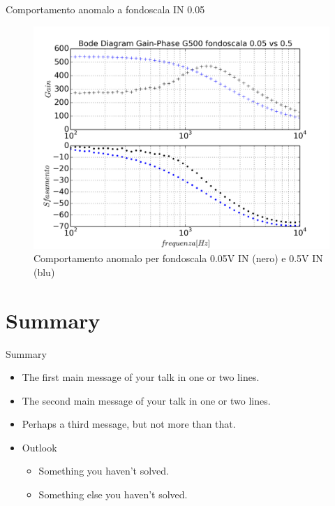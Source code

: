 \documentclass{beamer}
\begin{document}
\begin{frame}{Comportamento anomalo a fondoscala IN 0.05}
\begin{figure}
\centering
\includegraphics[width=0.9\linewidth]{./es_9_bode_g500_strano_bi}
\caption{Comportamento anomalo per fondoscala 0.05V IN (nero) e 0.5V IN (blu)}
\label{fig:es_9_bode_g500_strano_bi}
\end{figure}

\end{frame}

\section*{Summary}

\begin{frame}{Summary}
  \begin{itemize}
  \item
    The \alert{first main message} of your talk in one or two lines.
  \item
    The \alert{second main message} of your talk in one or two lines.
  \item
    Perhaps a \alert{third message}, but not more than that.
  \end{itemize}
  
  \begin{itemize}
  \item
    Outlook
    \begin{itemize}
    \item
      Something you haven't solved.
    \item
      Something else you haven't solved.
    \end{itemize}
  \end{itemize}
\end{frame}
\end{document}
